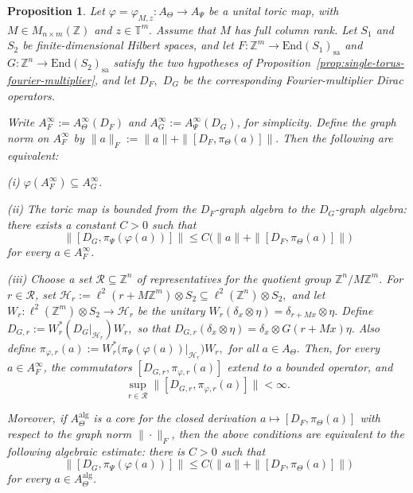\documentclass[11pt]{amsart}
\newtheorem{proposition}[theorem]{Proposition}
\theoremstyle{definition}
\theoremstyle{remark}
\newcommand{\T}{\mathbb{T}}
\newcommand{\Z}{\mathbb{Z}}
\newcommand{\End}{\mathrm{End}}
\begin{document}
\begin{proposition}%
\label{prop:FG-morphism-condition-criterion}
Let $\varphi=\varphi_{M,z}\colon A_\Theta\to A_\Psi$
be a unital toric map, with $M\in M_{n\times m}(\Z)$ and 
$z\in\T^m.$
Assume that $M$ has full column rank. Let $S_1$ and $S_2$ be finite-dimensional Hilbert spaces, and let $F\colon \Z^m\to \End(S_1)_{\mathrm{sa}}$ and 
$G\colon \Z^n\to \End(S_2)_{\mathrm{sa}}$
satisfy the two hypotheses of
Proposition~\ref{prop:single-torus-fourier-multiplier}, and let $D_F,$ $D_G$
be the corresponding Fourier-multiplier Dirac operators.

Write $A_F^\infty:=A_\Theta^\infty(D_F)$ and
$A_G^\infty:=A_\Psi^\infty(D_G)$, for simplicity. 
Define the graph norm on \(A_F^\infty\) by
$\|a\|_F:=\|a\|+\|[D_F,\pi_\Theta(a)]\|.$ Then the following are equivalent:

\smallskip

\noindent
 \emph{(i)} $\varphi(A_F^\infty)\subseteq A_G^\infty.$
 
 \smallskip

\noindent
 \emph{(ii)} The toric map is bounded from the \(D_F\)-graph algebra to the
\(D_G\)-graph algebra: there exists a constant \(C>0\) such that
\begin{equation}\label{eq:graph-bound-FG}
\|[D_G,\pi_\Psi(\varphi(a))]\|
\leq
C\bigl(\|a\|+\|[D_F,\pi_\Theta(a)]\|\bigr)
\end{equation}
for every $a\in A_F^\infty$.

 \smallskip

\noindent
 \emph{(iii)}  Choose a set $\mathcal R\subseteq \Z^n$ of representatives
for the quotient group $\Z^n/M\Z^m.$
For $r\in\mathcal R$, set $\mathcal H_r:=\ell^2(r+M\Z^m)\otimes S_2
\subseteq
\ell^2(\Z^n)\otimes S_2,$
and let $W_r\colon \ell^2(\Z^m)\otimes S_2\to \mathcal H_r$
be the unitary  $W_r(\delta_x\otimes \eta)=\delta_{r+Mx}\otimes \eta.$ Define
$D_{G,r}:=W_r^*(D_G|_{\mathcal H_r})W_r,$
so that $D_{G,r}(\delta_x\otimes\eta)=\delta_x\otimes G(r+Mx)\eta.$
Also define $\pi_{\varphi,r}(a):=W_r^*\bigl(\pi_\Psi(\varphi(a))|_{\mathcal H_r}\bigr)W_r,$
for all $a\in A_\Theta.$
Then, for every $a\in A_F^\infty$,  the commutators $[D_{G,r},\pi_{\varphi,r}(a)]$
extend to a bounded operator, and
\begin{equation}\label{eq:coset-uniform-condition}
\sup_{r\in\mathcal R}
\bigl\|
[D_{G,r},\pi_{\varphi,r}(a)]
\bigr\|
<\infty.
\end{equation}



Moreover, if $A_\Theta^{\mathrm{alg}}$ is a core for the closed derivation $a\longmapsto [D_F,\pi_\Theta(a)]$
with respect to the graph norm $\|\cdot\|_F$, then the above conditions are
equivalent to the following algebraic estimate: there is $C>0$ such that
\begin{equation}\label{eq:algebraic-graph-bound-FG}
\|[D_G,\pi_\Psi(\varphi(a))]\|
\leq
C\bigl(\|a\|+\|[D_F,\pi_\Theta(a)]\|\bigr)
\end{equation}
for every $a\in A_\Theta^{\mathrm{alg}}$.
\end{proposition}
\end{document}

